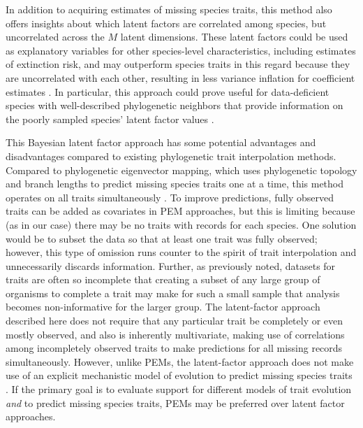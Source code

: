 In addition to acquiring estimates of missing species traits, this method also offers insights about which latent factors are correlated among species, but uncorrelated across the $M$ latent dimensions.
These latent factors could be used as explanatory variables for other species-level characteristics, including estimates of extinction risk, and may outperform species traits in this regard because they are uncorrelated with each other, resulting in less variance inflation for coefficient estimates \citep{Stine1995}.
In particular, this approach could prove useful for data-deficient species with well-described phylogenetic neighbors that provide information on the poorly sampled species' latent factor values \citep{Morais2013}.

This Bayesian latent factor approach has some potential advantages and disadvantages compared to existing phylogenetic trait interpolation methods.
Compared to phylogenetic eigenvector mapping, which uses phylogenetic topology and branch lengths to predict missing species traits one at a time, this method operates on all traits simultaneously \citep{Guenard2013}.
To improve predictions, fully observed traits can be added as covariates in PEM approaches, but this is limiting because (as in our case) there may be no traits with records for each species.
One solution would be to subset the data so that at least one trait was fully observed; however, this type of omission runs counter to the spirit of trait interpolation and unnecessarily discards information. Further, as previously noted, datasets for traits are often so incomplete that creating a subset of any large group of organisms to complete a trait may make for such a small sample that analysis becomes non-informative for the larger group.
The latent-factor approach described here does not require that any particular trait be completely or even mostly observed, and also is inherently multivariate, making use of correlations among incompletely observed traits to make predictions for all missing records simultaneously.
However, unlike PEMs, the latent-factor approach does not make use of an explicit mechanistic model of evolution to predict missing species traits \citep{AlexandreFelizolaDiniz-Filho2001, FelizolaDinizFilho2012}.
If the primary goal is to evaluate support for different models of trait evolution \textit{and} to predict missing species traits, PEMs may be preferred over latent factor approaches.

